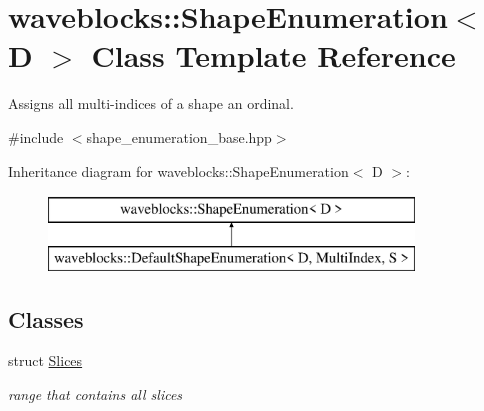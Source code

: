 \hypertarget{classwaveblocks_1_1_shape_enumeration}{}\section{waveblocks\+:\+:Shape\+Enumeration$<$ D $>$ Class Template Reference}
\label{classwaveblocks_1_1_shape_enumeration}


Assigns all multi-\/indices of a shape an ordinal.  




{\ttfamily \#include $<$shape\+\_\+enumeration\+\_\+base.\+hpp$>$}

Inheritance diagram for waveblocks\+:\+:Shape\+Enumeration$<$ D $>$\+:\begin{figure}[H]
\begin{center}
\leavevmode
\includegraphics[height=2.000000cm]{classwaveblocks_1_1_shape_enumeration}
\end{center}
\end{figure}
\subsection*{Classes}
\begin{DoxyCompactItemize}
\item 
struct \hyperlink{structwaveblocks_1_1_shape_enumeration_1_1_slices}{Slices}
\begin{DoxyCompactList}\small\item\em range that contains all slices \end{DoxyCompactList}\end{DoxyCompactItemize}
